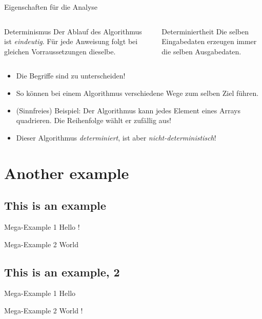 \documentclass[aspectratio=169,usepdftitle=true,t]{beamer}
\newcommand\twosplit[3][t]{%
    \begin{columns}[#1]
    \begin{column}{0.475\linewidth}
        #2
    \end{column}\hfill
    \begin{column}{0.475\linewidth}
        #3
    \end{column}
    \end{columns}
}
\begin{document}
\begin{frame}{Eigenschaften für die Analyse}
    \twosplit{%
    \begin{block}{Determinismus}
        Der Ablauf des Algorithmus ist \emph{eindeutig}. Für jede Anweisung folgt bei gleichen Vorraussetzungen dieselbe.
    \end{block}
    }{%
    \begin{block}{Determiniertheit}
        Die selben Eingabedaten erzeugen immer die selben Ausgabedaten.
    \end{block}
    }\bigskip
    \begin{itemize}
        \item Die Begriffe sind zu unterscheiden!
        \item So können bei einem Algorithmus verschiedene Wege zum selben Ziel führen.
        \item (Sinnfreies) Beispiel: Der Algorithmus kann jedes Element eines Arrays quadrieren. Die Reihenfolge wählt er zufällig aus!
        \item Dieser Algorithmus \emph{determiniert}, ist aber \emph{nicht-deterministisch}!
    \end{itemize}
\end{frame}


\section{Another example}
\subsection{This is an example}

\begin{frame}{Mega-Example 1}
    Hello \cite{knuth-fa}!
\end{frame}

\begin{frame}{Mega-Example 2}
    World
\end{frame}

\subsection{This is an example, 2}

\begin{frame}{Mega-Example 1}
    Hello
\end{frame}

\begin{frame}{Mega-Example 2}
    World \cite{knuth-web}!
\end{frame}
\end{document}
